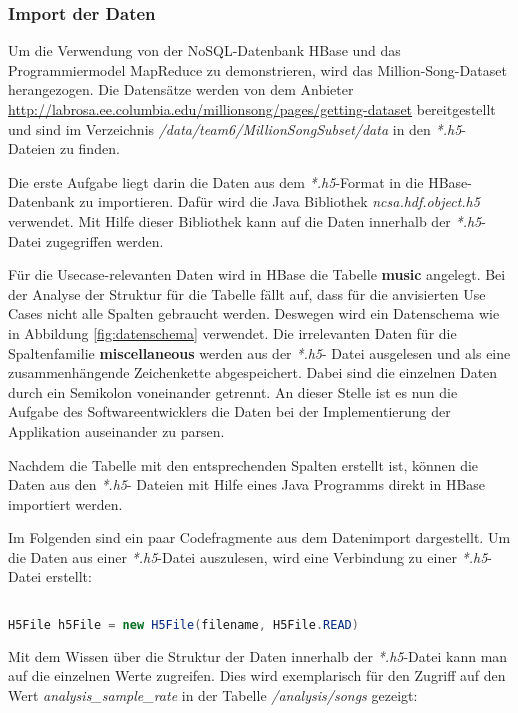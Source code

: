 \subsubsection{Import der Daten}
Um die Verwendung von der NoSQL-Datenbank HBase und das Programmiermodel MapReduce zu demonstrieren, wird das Million-Song-Dataset herangezogen. Die Datensätze werden von dem Anbieter \url{http://labrosa.ee.columbia.edu/millionsong/pages/getting-dataset} bereitgestellt und  sind im Verzeichnis \textit{/data/team6/MillionSongSubset/data} in den \textit{*.h5}-Dateien zu finden. 

Die erste Aufgabe liegt darin die Daten aus dem \textit{*.h5}-Format in die HBase-Datenbank zu importieren.
Dafür wird die Java Bibliothek \textit{ncsa.hdf.object.h5} verwendet. Mit Hilfe dieser Bibliothek kann auf die Daten innerhalb der \textit{*.h5}-Datei zugegriffen werden.

Für die Usecase-relevanten Daten wird in HBase die Tabelle \textbf{music} angelegt. Bei der Analyse der Struktur für die Tabelle fällt auf, dass für die anvisierten Use Cases nicht alle Spalten gebraucht werden. Deswegen wird ein Datenschema wie in Abbildung \ref{fig:datenschema} verwendet. Die irrelevanten Daten für die Spaltenfamilie \textbf{miscellaneous} werden aus der \textit{*.h5}- Datei ausgelesen und als eine zusammenhängende Zeichenkette abgespeichert. Dabei sind die einzelnen Daten durch ein Semikolon voneinander getrennt. An dieser Stelle ist es nun die Aufgabe des Softwareentwicklers die Daten bei der Implementierung der Applikation auseinander zu parsen.

Nachdem die Tabelle mit den entsprechenden Spalten erstellt ist, können die Daten aus den \textit{*.h5}- Dateien mit Hilfe eines Java Programms direkt in HBase importiert werden.

Im Folgenden sind ein paar Codefragmente aus dem Datenimport dargestellt.
Um die Daten aus einer \textit{*.h5}-Datei auszulesen, wird eine Verbindung zu einer \textit{*.h5}-Datei erstellt:



\begin{lstlisting}[language=Java]%[caption={fgdfgfd}, label=mapreduce:dgdgs]

H5File h5File = new H5File(filename, H5File.READ)
\end{lstlisting}
Mit dem Wissen über die Struktur der Daten innerhalb der \textit{*.h5}-Datei kann man auf die einzelnen Werte zugreifen. Dies wird exemplarisch für den Zugriff auf den Wert \textit{analysis\_sample\_rate} in der Tabelle \textit{/analysis/songs} gezeigt:\\

